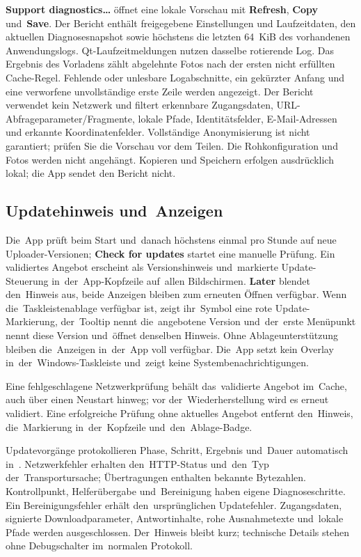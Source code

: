 \documentclass[11pt,a4paper]{article}
\newcommand{\ui}[1]{\textbf{#1}}
\begin{document}
\ui{Support diagnostics…} öffnet eine lokale Vorschau mit \ui{Refresh},
\ui{Copy} und~\ui{Save}. Der Bericht enthält freigegebene Einstellungen und
Laufzeitdaten, den aktuellen Diagnosesnapshot sowie höchstens die letzten
64~KiB des vorhandenen Anwendungslogs. Qt-Laufzeitmeldungen nutzen dasselbe
rotierende Log. Das Ergebnis des Vorladens zählt abgelehnte Fotos nach der
ersten nicht erfüllten Cache-Regel. Fehlende oder unlesbare Logabschnitte,
ein gekürzter Anfang und eine verworfene unvollständige erste Zeile werden
angezeigt. Der Bericht verwendet kein Netzwerk
und filtert erkennbare Zugangsdaten, URL-Abfrageparameter/Fragmente, lokale
Pfade, Identitätsfelder, E-Mail-Adressen und erkannte Koordinatenfelder.
Vollständige Anonymisierung ist nicht garantiert; prüfen Sie die Vorschau vor
dem Teilen. Die Rohkonfiguration und Fotos werden nicht angehängt. Kopieren
und Speichern erfolgen ausdrücklich lokal; die App sendet den Bericht nicht.

\subsection{Updatehinweis und~Anzeigen}

Die~App prüft beim Start und~danach höchstens einmal pro Stunde auf neue
Uploader-Versionen; \ui{Check for updates} startet eine manuelle Prüfung. Ein
validiertes Angebot erscheint als Versionshinweis und~markierte Update-Steuerung
in~der~App-Kopfzeile auf~allen Bildschirmen. \ui{Later} blendet den~Hinweis aus,
beide Anzeigen bleiben zum erneuten Öffnen verfügbar. Wenn die~Taskleistenablage
verfügbar ist, zeigt ihr~Symbol eine rote Update-Markierung, der~Tooltip nennt
die~angebotene Version und~der~erste Menüpunkt nennt diese Version und~öffnet
denselben Hinweis. Ohne Ablageunterstützung bleiben die~Anzeigen in~der~App voll
verfügbar. Die~App setzt kein Overlay in~der~Windows-Taskleiste und~zeigt keine
Systembenachrichtigungen.

Eine fehlgeschlagene Netzwerkprüfung behält das~validierte Angebot im~Cache,
auch über einen Neustart hinweg; vor der~Wiederherstellung wird es erneut
validiert. Eine erfolgreiche Prüfung ohne aktuelles Angebot entfernt
den~Hinweis,
die~Markierung in~der~Kopfzeile und~den~Ablage-Badge.

Updatevorgänge protokollieren Phase, Schritt, Ergebnis und~Dauer automatisch
in~. Netzwerkfehler erhalten den~HTTP-Status und~den~Typ
der~Transportursache; Übertragungen enthalten bekannte Bytezahlen.
Kontrollpunkt, Helferübergabe und~Bereinigung haben eigene Diagnoseschritte.
Ein Bereinigungsfehler erhält den~ursprünglichen Updatefehler. Zugangsdaten,
signierte Downloadparameter, Antwortinhalte, rohe Ausnahmetexte und~lokale
Pfade werden ausgeschlossen. Der~Hinweis bleibt kurz; technische Details
stehen ohne Debugschalter im~normalen Protokoll.
\end{document}
